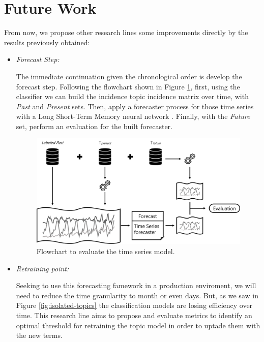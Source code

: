 \section{Future Work}

From now, we propose other research lines some improvements directly by the results previously obtained:

\begin{itemize}
	\item \textit{Forecast Step:}
	
	The immediate continuation given the chronological order is develop the forecast step. Following the flowchart shown in Figure \ref{fig:forecast}, first, using the classifier we can build the incidence topic incidence matrix over time, with \textit{Past} and \textit{Present} sets. Then, apply a forecaster process for those time series with a Long Short-Term Memory neural network \cite{hochreiter1997long}. Finally, with the \textit{Future} set, perform an evaluation for the built forecaster.
	
	\begin{figure}[h!]
		\centering
		\includegraphics[width=0.8\linewidth]{01.Chapters/04.Materials/forecast}
		\caption{Flowchart to evaluate the time series model.}
		\label{fig:forecast}
	\end{figure}
	
	\item \textit{Retraining point:}
	
	Seeking to use this forecasting famework in a production enviroment, we will need to reduce the time granularity to month or even days. But, as we saw in Figure \ref{fig:isolated-topics} the classification models are losing efficiency over time. This research line aims to propose and evaluate metrics to identify an optimal threshold for retraining the topic model in order to uptade them with the new terms.
	
	

\end{itemize}
